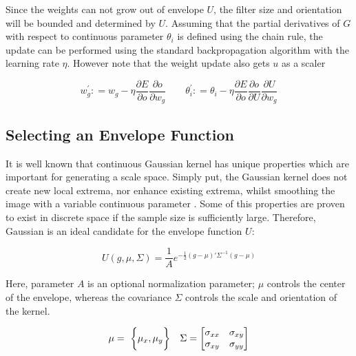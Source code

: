 \documentclass{bmvc2k}
\begin{document}
Since the weights can not grow out of envelope $U$, the filter size and orientation will be bounded and determined by $U$. Assuming that the partial derivatives of $G$ with respect to continuous parameter $\theta_i$ is defined using the chain rule, the update can be performed using the standard backpropagation algorithm with the learning rate $\eta$. However note that the weight update also gets $u$ as a scaler

\begin{equation}
w_{g}^{'} \mathrel{{:}{=}} w_{g} - \eta \frac{\partial E}{\partial o} \frac{\partial o}{\partial w_{g}}\qquad
\label{eq:genericderive}
\theta_{i}^{'} \mathrel{{:}{=}} \theta_{i} - \eta \frac{\partial E}{\partial o} \frac{\partial o}{\partial U} \frac{\partial U}{\partial w_{g}}
\end{equation}



\subsection{Selecting an Envelope Function}
\label{sec:methods:gaussian}

It is well known that continuous Gaussian kernel has unique properties which are important for generating a scale space. Simply put, the Gaussian kernel does not create new local extrema, nor enhance existing extrema, whilst smoothing the image with a variable continuous parameter \cite{Lindeberg:1994:STC:528688}. Some of this properties are proven to exist in discrete space if the sample size is sufficiently large. Therefore, Gaussian is an ideal candidate for the envelope function $U$:


\begin{equation}
U(g, \mu, \Sigma) = \frac{1}{A} e ^{ - \frac{1}{2} (g-\mu)' \Sigma^{-1} (g-\mu)}
\end{equation}

Here, parameter $A$ is an optional normalization parameter; $\mu$ controls the center of the envelope, whereas the covariance $\Sigma$ controls the scale and orientation of the kernel. 

\begin{equation}
\label{eq:initmu}
\mu = \ \bigg{\{} \mu_x, \mu_y \bigg{\}} \quad
\Sigma =  \begin{bmatrix} \sigma_{xx} & \sigma_{xy} \\ \sigma_{xy} & \sigma_{yy} \end{bmatrix}
\end{equation}
 
\end{document}
